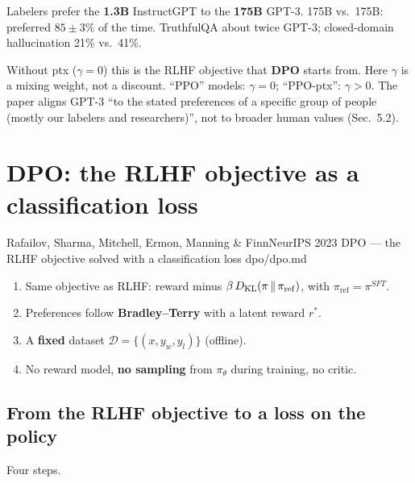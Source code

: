 \begin{keybox}[title={Results}]
Labelers prefer the \textbf{1.3B} InstructGPT to the \textbf{175B} GPT-3. 175B vs.\ 175B: preferred $85\pm3\%$ of the time. TruthfulQA about twice GPT-3; closed-domain hallucination 21\% vs.\ 41\%.
\end{keybox}

\begin{notebox}
Without ptx ($\gamma=0$) this is the RLHF objective that \textbf{DPO} starts from. Here $\gamma$ is a mixing weight, not a discount. ``PPO'' models: $\gamma=0$; ``PPO-ptx'': $\gamma>0$. The paper aligns GPT-3 ``to the stated preferences of a specific group of people (mostly our labelers and researchers)'', not to broader human values (Sec.~5.2).
\end{notebox}

\section{DPO: the RLHF objective as a classification loss}

  {Rafailov, Sharma, Mitchell, Ermon, Manning \& Finn}{NeurIPS 2023}
  {DPO --- the RLHF objective solved with a classification loss}
  {dpo/dpo.md}

\begin{enumerate}
  \item Same objective as RLHF: reward minus $\beta\,D_{\mathrm{KL}}(\pi\,\|\,\pi_{\mathrm{ref}})$, with $\pi_{\mathrm{ref}}=\pi^{SFT}$.
  \item Preferences follow \textbf{Bradley--Terry} with a latent reward $r^*$.
  \item A \textbf{fixed} dataset $\mathcal D=\{(x,y_w,y_l)\}$ (offline).
  \item No reward model, \textbf{no sampling} from $\pi_\theta$ during training, no critic.
\end{enumerate}

\subsection{From the RLHF objective to a loss on the policy}

Four steps.

